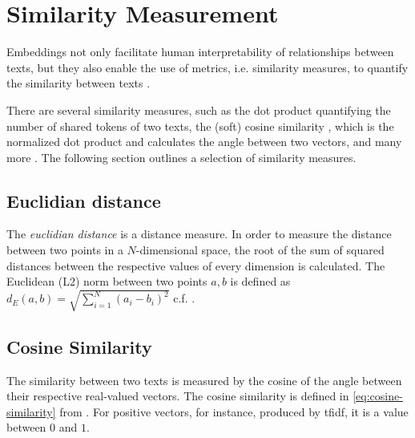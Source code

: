 
\section{Similarity Measurement}\label{sec:similarity-measurement}

Embeddings not only facilitate human interpretability of relationships between texts, 
but they also enable the use of metrics, i.e. similarity measures, to quantify the similarity between texts \cite{IR2011, euclidean_l2_norm2015}.

There are several similarity measures, such as the dot product quantifying the number of shared tokens of two texts, 
the (soft) cosine similarity \cite{soft_cosine2014, soft_cosine2017}, which is the normalized dot product and calculates the angle between two vectors, 
and many more \cite{IR2011, euclidean_l2_norm2015, HfsentTrans2019}.
The following section outlines a selection of similarity measures.


\subsection{Euclidian distance}\label{subsec:euclidian-distance}

The \textit{euclidian distance} is a distance measure.
In order to measure the distance between two points in a $N$-dimensional space, 
the root of the sum of squared distances between the respective values of every dimension is calculated.
The Euclidean (L2) norm between two points $a, b$ is defined as $d_E(a,b) = \sqrt{\sum_{i=1}^{N}(a_i - b_i)^2}$ c.f. \cite{euclidean_l2_norm2015}.


\subsection{Cosine Similarity}\label{subsec:cosine-similarity}


The similarity between two texts is measured by the cosine of the angle between their respective real-valued vectors.
The cosine similarity is defined in \autoref{eq:cosine-similarity} from \cite{soft_cosine2014}.
For positive vectors, for instance, produced by \ac{tfidf}, it is a value between $0$ and $1$.

